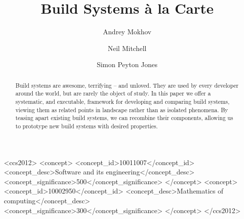 \documentclass[acmsmall,screen]{acmart}\settopmatter{}
\begin{document}
\title[Build Systems \`a la Carte]{Build Systems \`a la Carte}

\author{Andrey Mokhov}

\author{Neil Mitchell}

\author{Simon Peyton Jones}

\begin{abstract}
Build systems are awesome, terrifying -- and unloved. They are used by
every developer
around the world, but are rarely the object of study. In this paper we offer a
systematic, and executable, framework for developing and comparing build
systems, viewing them as related points in landscape rather than as isolated
phenomena. By teasing apart existing build systems, we can recombine their
components, allowing us to prototype new build systems with desired properties.
\end{abstract}

\begin{CCSXML}
<ccs2012>
<concept>
<concept_id>10011007</concept_id>
 <concept_desc>Software and its engineering</concept_desc>
<concept_significance>500</concept_significance>
</concept>
<concept>
<concept_id>10002950</concept_id>
 <concept_desc>Mathematics of computing</concept_desc>
<concept_significance>300</concept_significance>
</concept>
</ccs2012>
\end{CCSXML}

\maketitle









\end{document}
